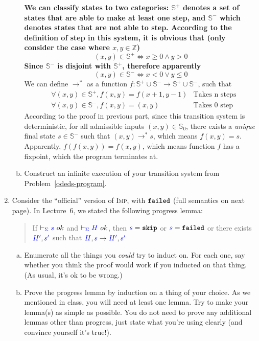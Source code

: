 \documentclass{article}
\newcommand{\meta}[1]{{\color{blue}#1}}
\newcommand{\imp}{\textsc{Imp}}
\newcommand{\impskip}{\ensuremath{\text{\ttfamily\bfseries skip}}}
\newcommand{\failed}{\ensuremath{\text{\ttfamily\bfseries failed}}}
\begin{document}
\begin{enumerate}[leftmargin=*,itemindent=*,start=1,label={{\bf Problem \arabic*}.},ref=\arabic*]
\begin{enumerate}[(a)]
    \textbf{We can classify states to two categories: $\mathbb{S}^+$ denotes a set of states that are able to make at least one step, and $\mathbb{S}^-$ which denotes states that are not able to step. According to the definition of step in this system, it is obvious that (only consider the case where $x, y \in \mathbb{Z}$)
    $$(x, y) \in \mathbb{S}^+ \Leftrightarrow x \geq 0 \wedge y > 0$$ Since $\mathbb{S}^-$ is disjoint with $\mathbb{S}^+$, therefore apparently $$(x, y)\in \mathbb{S}^- \Leftrightarrow x < 0 \vee y \leq 0$$} We can define $\to^*$ as a function $f : \mathbb{S}^+ \cup \mathbb{S}^- \to \mathbb{S}^+ \cup \mathbb{S}^-$, such that
    \begin{align*}
      &\forall (x, y)
 \in \mathbb{S}^+, f(x, y) = f (x + 1, y - 1) & \text{Takes n steps}\\
      & \forall (x, y) \in \mathbb{S}^-, f(x, y) = (x, y) & \text{Takes 0 step}
    \end{align*}
    According to the proof in previous part, since this transition system is deterministic, for all admissible inputs $(x, y) \in \mathbb{S}_0$, there exists a \textit{unique} final state $s \in \mathbb{S}^-$ such that $(x, y) \to^* s$, which means $f(x, y) = s$. Apparently, $f(f(x, y)) = f(x, y)$, which means function $f$ has a fixpoint, which the program terminates at.
  \item Construct an infinite execution of your transition system from
    Problem~\ref{odeds-program}.
  \end{enumerate}
\item Consider the ``official'' version of \imp{}, with \failed{} (full
  semantics on next page). In Lecture~6, we stated the following progress lemma:
  \begin{quote}
    If $\vdash_{\meta{\Sigma}} \meta{s}\ ok$ and
    $\vdash_{\meta{\Sigma}} \meta{H}\ ok$, then $\meta{s} = \impskip$ or
    $\meta{s} = \failed$ or there exists $\meta{H'},\meta{s'}$ such that
    $\meta{H},\meta{s} \to \meta{H'},\meta{s'}$
  \end{quote}
  \begin{enumerate}[(a)]
  \item Enumerate all the things you \emph{could} try to induct on. For each
    one, say whether you think the proof would work if you inducted on that thing.
    (As usual, it's ok to be wrong.)
  \item Prove the progress lemma by induction on a thing of your choice. As we
    mentioned in class, you will need at least one lemma. Try to make your
    lemma(s) as simple as possible.  You do not need to prove any additional
    lemmas other than progress, just state what you're using clearly (and
    convince yourself it's true!).
  \end{enumerate}

\end{enumerate}
\end{document}
